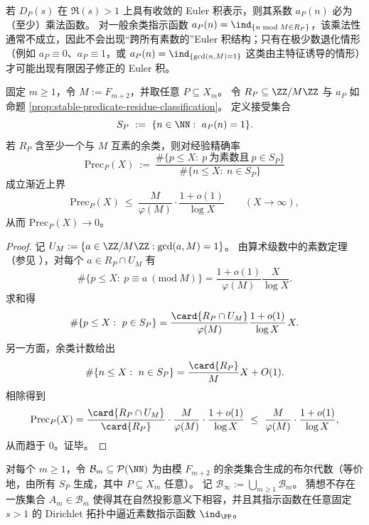 \begin{remark}\label{rem:euler-product-obstruction-periodic-indicator}
若 \(D_P(s)\) 在 \(\Re(s)>1\) 上具有收敛的 Euler 积表示，则其系数 \(a_P(n)\) 必为（至少）乘法函数。
对一般余类指示函数 \(a_P(n)=\ind_{\{n\bmod M\in R_P\}}\)，该乘法性通常不成立，因此不会出现“跨所有素数的”Euler 积结构；只有在极少数退化情形（例如 \(a_P\equiv 0\)、\(a_P\equiv 1\)，或 \(a_P(n)=\ind_{\{\gcd(n,M)=1\}}\) 这类由主特征诱导的情形）才可能出现有限因子修正的 Euler 积。
\end{remark}

\begin{theorem}[固定分辨率余类筛的素数精确率退化]\label{thm:fixed-resolution-prime-sieve-precision-to-zero}
固定 \(m\ge 1\)，令 \(M:=F_{m+2}\)，并取任意 \(P\subseteq X_m\)。
令 \(R_P\subseteq\ZZ/M\ZZ\) 与 \(a_P\) 如命题 \ref{prop:stable-predicate-residue-classification}。
定义接受集合
\[
S_P\ :=\ \{n\in\NN:\ a_P(n)=1\}.
\]
若 \(R_P\) 含至少一个与 \(M\) 互素的余类，则对经验精确率
\[
\mathrm{Prec}_P(X)\ :=\ \frac{\#\{p\le X:\ p\ \text{为素数且}\ p\in S_P\}}{\#\{n\le X:\ n\in S_P\}}
\]
成立渐近上界
\[
\mathrm{Prec}_P(X)\ \le\ \frac{M}{\varphi(M)}\cdot \frac{1+o(1)}{\log X}\qquad(X\to\infty),
\]
从而 \(\mathrm{Prec}_P(X)\to 0\)。
\end{theorem}

\begin{proof}
记 \(U_M:=\{a\in\ZZ/M\ZZ:\gcd(a,M)=1\}\)。
由算术级数中的素数定理（参见 \cite{Titchmarsh1986RiemannZeta}），对每个 \(a\in R_P\cap U_M\) 有
\[
\#\{p\le X:\ p\equiv a\ (\mathrm{mod}\ M)\}
=\frac{1+o(1)}{\varphi(M)}\frac{X}{\log X}.
\]
求和得
\[
\#\{p\le X:\ p\in S_P\}
=\frac{\card{R_P\cap U_M}}{\varphi(M)}\frac{1+o(1)}{\log X}\,X.
\]
另一方面，余类计数给出
\[
\#\{n\le X:\ n\in S_P\}=\frac{\card{R_P}}{M}X+O(1).
\]
相除得到
\[
\mathrm{Prec}_P(X)
=\frac{\card{R_P\cap U_M}}{\card{R_P}}\cdot\frac{M}{\varphi(M)}\cdot\frac{1+o(1)}{\log X}
\ \le\ \frac{M}{\varphi(M)}\cdot\frac{1+o(1)}{\log X},
\]
从而趋于 \(0\)。证毕。
\end{proof}

\begin{conjecture}\label{conj:prime-lift-obstruction-finite-resolution}
对每个 \(m\ge 1\)，令 \(\mathcal B_m\subseteq\mathcal P(\NN)\) 为由模 \(F_{m+2}\) 的余类集合生成的布尔代数（等价地，由所有 \(S_P\) 生成，其中 \(P\subseteq X_m\) 任意）。
记 \(\mathcal B_\infty:=\bigcup_{m\ge 1}\mathcal B_m\)。
猜想不存在一族集合 \(A_m\in\mathcal B_m\) 使得其在自然投影意义下相容，并且其指示函数在任意固定 \(s>1\) 的 Dirichlet 拓扑中逼近素数指示函数 \(\ind_{\PP}\)。
\end{conjecture}

